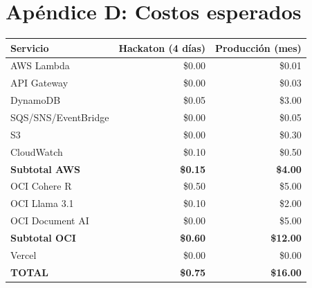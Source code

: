 \documentclass[11pt,a4paper]{article}
\begin{document}
\section{Ap\'endice D: Costos esperados}

\begin{tabular}{|l|r|r|}
\hline
\rowcolor{primary!20}
\textbf{Servicio} & \textbf{Hackaton (4 d\'ias)} & \textbf{Producci\'on (mes)} \\
\hline
AWS Lambda & \$0.00 & \$0.01 \\
API Gateway & \$0.00 & \$0.03 \\
DynamoDB & \$0.05 & \$3.00 \\
SQS/SNS/EventBridge & \$0.00 & \$0.05 \\
S3 & \$0.00 & \$0.30 \\
CloudWatch & \$0.10 & \$0.50 \\
\textbf{Subtotal AWS} & \textbf{\$0.15} & \textbf{\$4.00} \\
\hline
OCI Cohere R & \$0.50 & \$5.00 \\
OCI Llama 3.1 & \$0.10 & \$2.00 \\
OCI Document AI & \$0.00 & \$5.00 \\
\textbf{Subtotal OCI} & \textbf{\$0.60} & \textbf{\$12.00} \\
\hline
Vercel & \$0.00 & \$0.00 \\
\hline
\textbf{TOTAL} & \textbf{\$0.75} & \textbf{\$16.00} \\
\hline
\end{tabular}
\end{document}
